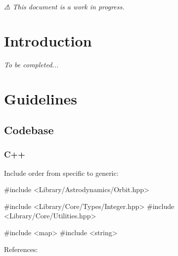 {\itshape ⚠ This document is a work in progress.}\hypertarget{md__c_o_n_t_r_i_b_u_t_i_n_g_Introduction}{}\section{Introduction}\label{md__c_o_n_t_r_i_b_u_t_i_n_g_Introduction}
{\itshape To be completed...}\hypertarget{md__c_o_n_t_r_i_b_u_t_i_n_g_Guidelines}{}\section{Guidelines}\label{md__c_o_n_t_r_i_b_u_t_i_n_g_Guidelines}
\hypertarget{md__c_o_n_t_r_i_b_u_t_i_n_g_Codebase}{}\subsection{Codebase}\label{md__c_o_n_t_r_i_b_u_t_i_n_g_Codebase}
\hypertarget{md__c_o_n_t_r_i_b_u_t_i_n_g_C}{}\subsubsection{C++}\label{md__c_o_n_t_r_i_b_u_t_i_n_g_C}
Include order from specific to generic\+:


\begin{DoxyCode}
\textcolor{preprocessor}{#include <Library/Astrodynamics/Orbit.hpp>}

\textcolor{preprocessor}{#include <Library/Core/Types/Integer.hpp>}
\textcolor{preprocessor}{#include <Library/Core/Utilities.hpp>}

\textcolor{preprocessor}{#include <map>}
\textcolor{preprocessor}{#include <string>}
\end{DoxyCode}


References\+:


